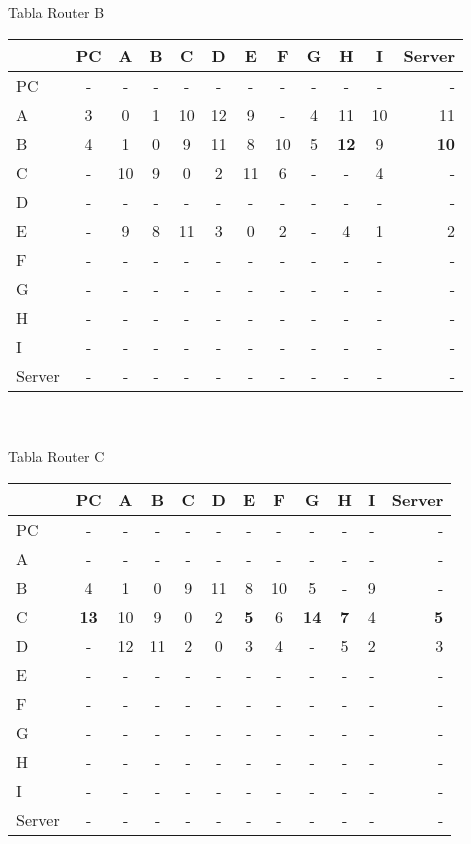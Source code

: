 \documentclass{article}
\begin{document}
\\
\\
Tabla Router B \\
\begin{tabular}{l*{10}{c}r}
              & PC & A & B & C & D & E & F & G & H & I & Server \\
\hline
PC             & - & - & - & - & - & - & - & - & - & - & -\\
A              & 3 & 0 & 1 & 10 & 12 & 9 & - & 4 & 11 & 10 & 11 \\
B              & 4 & 1 & 0 & 9 & 11 & 8 & 10 & 5 &\bf{12}& 9 &\bf{10}\\
C              & - & 10 & 9 & 0 & 2 & 11 & 6 & - & - & 4 & -\\
D              & - & - & - & - & - & - & - & - & - & - & -\\
E              & - & 9 & 8 & 11 & 3 & 0 & 2 & - & 4 & 1 & 2\\
F              & - & - & - & - & - & - & - & - & - & - & -\\
G              & - & - & - & - & - & - & - & - & - & - & -\\
H              & - & - & - & - & - & - & - & - & - & - & -\\
I              & - & - & - & - & - & - & - & - & - & - & -\\
Server         & - & - & - & - & - & - & - & - & - & - & -\\

\end{tabular}
\\
\\
Tabla Router C \\
\begin{tabular}{l*{10}{c}r}
              & PC & A & B & C & D & E & F & G & H & I & Server \\
\hline
PC             & - & - & - & - & - & - & - & - & - & - & -\\
A              & - & - & - & - & - & - & - & - & - & - & -\\
B              & 4 & 1 & 0 & 9 & 11	& 8 & 10 & 5 & - & 9 & -\\
C              &\bf{13}& 10 & 9 & 0 & 2 &\bf{5}& 6 &\bf{14}&\bf{7}& 4 &\bf{5}\\
D              & - & 12 & 11 & 2 & 0 & 3 & 4 & - & 5 & 2 & 3\\
E              & - & - & - & - & - & - & - & - & - & - & -\\
F              & - & - & - & - & - & - & - & - & - & - & -\\
G              & - & - & - & - & - & - & - & - & - & - & -\\
H              & - & - & - & - & - & - & - & - & - & - & -\\
I              & - & - & - & - & - & - & - & - & - & - & -\\
Server         & - & - & - & - & - & - & - & - & - & - & -\\
\end{tabular}
\end{document}
